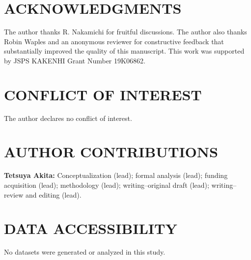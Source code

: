 \documentclass[12pt, English]{article}
\begin{document}
\begin{spacing}{1.9}
\begin{comment}
\end{comment}

\section*{ACKNOWLEDGMENTS}
The author thanks R. Nakamichi for fruitful discussions. The author also thanks Robin Waples and an anonymous reviewer for constructive feedback that substantially improved the quality of this manuscript. This work was supported by JSPS KAKENHI Grant Number 19K06862.

\section*{CONFLICT OF INTEREST}
The author declares no conflict of interest.

\section*{AUTHOR CONTRIBUTIONS}
{\bf Tetsuya Akita:} Conceptualization (lead); formal analysis (lead); funding acquisition (lead); methodology (lead); writing--original draft (lead); writing--review and editing (lead).

\section*{DATA ACCESSIBILITY}
No datasets were generated or analyzed in this study.




\clearpage


\end{spacing}
\end{document}
